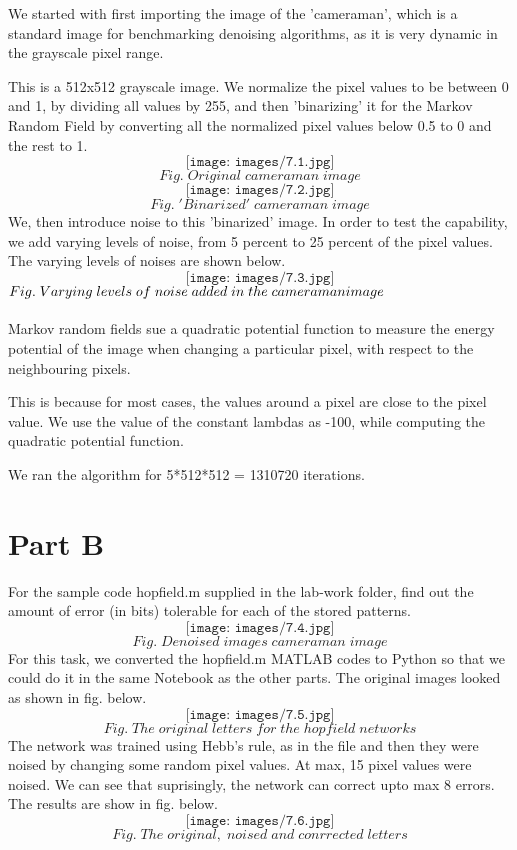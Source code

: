 \documentclass[conference]{IEEEtran}
\begin{document}
We started with first importing the image of the ’cameraman’, which is a standard image for benchmarking denoising
algorithms, as it is very dynamic in the grayscale pixel range.

This is a 512x512 grayscale image. We normalize the pixel
values to be between 0 and 1, by dividing all values by 255,
and then ’binarizing’ it for the Markov Random Field by
converting all the normalized pixel values below 0.5 to 0 and
the rest to 1.\\
$$\texttt{[image: images/7.1.jpg]}$$
$$Fig. \; Original \; cameraman \; image $$
$$\texttt{[image: images/7.2.jpg]}$$
$$Fig. \; 'Binarized' \; cameraman \; image $$
We, then introduce noise to this ’binarized’ image. In order
to test the capability, we add varying levels of noise, from 5 percent 
to 25 percent of the pixel values.
The varying levels of noises are shown below.
$$\texttt{[image: images/7.3.jpg]}$$
$Fig. \;  Varying\;  levels \; of\; noise\; added\; in\; the\; cameraman\\image $ \\ \\
Markov random fields sue a quadratic potential function to
measure the energy potential of the image when changing a
particular pixel, with respect to the neighbouring pixels.

This is because for most cases, the values around a pixel
are close to the pixel value. We use the value of
the constant lambdas as -100, while computing the quadratic
potential function.

We ran the algorithm for 5*512*512 = 1310720 iterations.
\section{Part B} 
For the sample code hopfield.m supplied in the lab-work
folder, find out the amount of error (in bits) tolerable for each
of the stored patterns.
$$\texttt{[image: images/7.4.jpg]}$$
$$Fig. \; Denoised \; images \; cameraman \; image $$
For this task, we converted the hopfield.m MATLAB codes
to Python so that we could do it in the same Notebook as the
other parts.
The original images looked as shown in fig. below.
$$\texttt{[image: images/7.5.jpg]}$$
$$Fig. \; The\; original\; letters\; for\; the\; hopfield\; networks $$
The network was trained using Hebb’s rule, as in the file
and then they were noised by changing some random pixel
values. At max, 15 pixel values were noised.
We can see that suprisingly, the network can correct upto
max 8 errors. The results are show in fig. below.
$$\texttt{[image: images/7.6.jpg]}$$
$$Fig. \;The \; original, \; noised \; and \; conrrected \; letters $$
\end{document}
